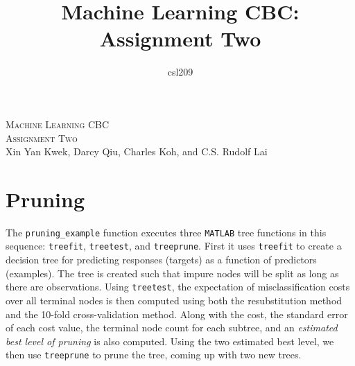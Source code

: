 \documentclass[a4paper,10pt]{article}
\title{Machine Learning CBC: Assignment Two}
\author{csl209}
\date{}
\begin{document}
\LARGE\noindent
\textsc{Machine Learning CBC \\ Assignment Two} \\[1cm]

\large\noindent
Xin Yan Kwek, Darcy Qiu, Charles Koh, and C.S. Rudolf Lai\\ 

\normalsize

\section*{Pruning}

The \texttt{pruning\_example} function executes three \texttt{MATLAB} tree functions in this sequence: \texttt{treefit}, \texttt{treetest}, and \texttt{treeprune}. First it uses \texttt{treefit} to create a decision tree for predicting responses (targets) as a function of predictors (examples).  The tree is created such that impure nodes will be split as long as there are observations. Using \texttt{treetest}, the expectation of misclassification costs over all terminal nodes is then computed using both the resubstitution method and the 10-fold cross-validation method. Along with the cost, the standard error of each cost value, the terminal node count for each subtree, and an \textit{estimated best level of pruning} is also computed. Using the two estimated best level, we then use \texttt{treeprune} to prune the tree, coming up with two new trees.
\end{document}
